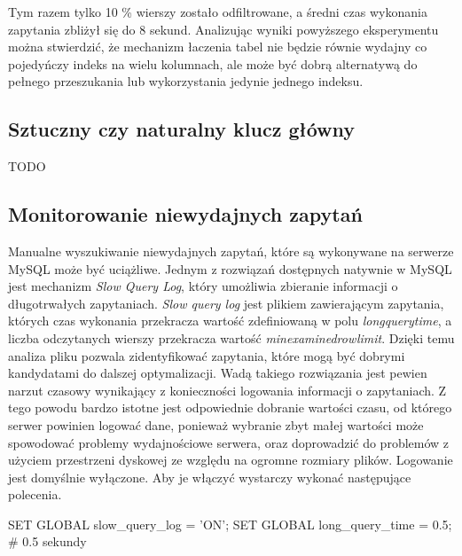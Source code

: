 Tym razem tylko 10 \% wierszy zostało odfiltrowane, a średni czas wykonania zapytania zbliżył się do 8 sekund. Analizując wyniki powyższego eksperymentu można stwierdzić, że mechanizm łaczenia tabel nie będzie równie wydajny co pojedyńczy indeks na wielu kolumnach, ale może być dobrą alternatywą do pełnego przeszukania lub wykorzystania jedynie jednego indeksu.
\subsection{Sztuczny czy naturalny klucz główny}
TODO

\subsection{Monitorowanie niewydajnych zapytań}
Manualne wyszukiwanie niewydajnych zapytań, które są wykonywane na serwerze MySQL może być uciążliwe. Jednym z rozwiązań dostępnych natywnie w MySQL jest mechanizm \textit{Slow Query Log}, który umożliwia zbieranie informacji o długotrwałych zapytaniach. \textit{Slow query log} jest plikiem zawierającym zapytania, których czas wykonania przekracza wartość zdefiniowaną w polu \textit{long\textunderscore query\textunderscore time}, a liczba odczytanych wierszy przekracza wartość \textit{min\textunderscore examined\textunderscore row\textunderscore limit}. Dzięki temu analiza pliku pozwala zidentyfikować zapytania, które mogą być dobrymi kandydatami do dalszej optymalizacji. Wadą takiego rozwiązania jest pewien narzut czasowy wynikający z konieczności logowania informacji o zapytaniach. Z tego powodu bardzo istotne jest odpowiednie dobranie wartości czasu, od którego serwer powinien logować dane, ponieważ wybranie zbyt małej wartości może spowodować problemy wydajnościowe serwera, oraz doprowadzić do problemów z użyciem przestrzeni dyskowej ze względu na ogromne rozmiary plików. Logowanie jest domyślnie wyłączone. Aby je włączyć wystarczy wykonać następujące polecenia.
\begin{spverbatim}
	SET GLOBAL slow_query_log = 'ON';
	SET GLOBAL long_query_time = 0.5; # 0.5 sekundy
\end{spverbatim}
